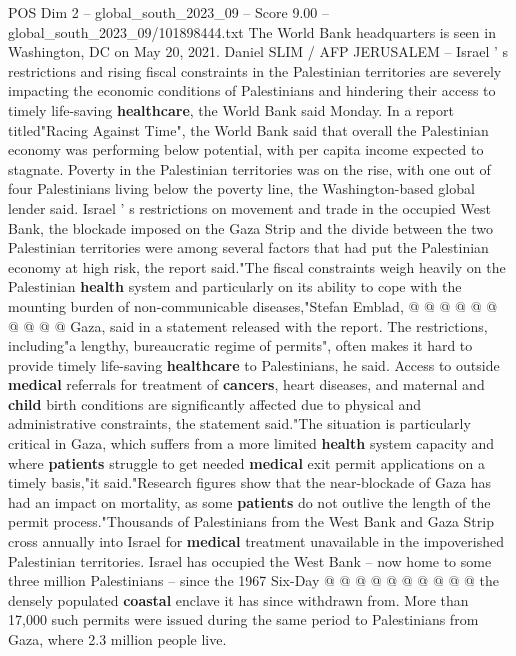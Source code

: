 \begin{textsample}{POS Dim 2 – global\_south\_2023\_09 – Score 9.00 – global\_south\_2023\_09/101898444.txt}  \label{ex:f2_pos_442}
The World Bank headquarters is seen in Washington, DC on May 20, 2021.
Daniel SLIM / AFP JERUSALEM -- Israel ' s restrictions and rising fiscal constraints in the Palestinian territories are severely impacting the economic conditions of Palestinians and hindering their access to timely life-saving \textbf{healthcare}, the World Bank said Monday.
In a report titled"Racing Against Time", the World Bank said that overall the Palestinian economy was performing below potential, with per capita income expected to stagnate.
Poverty in the Palestinian territories was on the rise, with one out of four Palestinians living below the poverty line, the Washington-based global lender said.
Israel ' s restrictions on movement and trade in the occupied West Bank, the blockade imposed on the Gaza Strip and the divide between the two Palestinian territories were among several factors that had put the Palestinian economy at high risk, the report said."The fiscal constraints weigh heavily on the Palestinian \textbf{health} system and particularly on its ability to cope with the mounting burden of non-communicable diseases,"Stefan Emblad, @ @ @ @ @ @ @ @ @ @ Gaza, said in a statement released with the report.
The restrictions, including"a lengthy, bureaucratic regime of permits", often makes it hard to provide timely life-saving \textbf{healthcare} to Palestinians, he said.
Access to outside \textbf{medical} referrals for treatment of \textbf{cancers}, heart diseases, and maternal and \textbf{child} birth conditions are significantly affected due to physical and administrative constraints, the statement said."The situation is particularly critical in Gaza, which suffers from a more limited \textbf{health} system capacity and where \textbf{patients} struggle to get needed \textbf{medical} exit permit applications on a timely basis,"it said."Research figures show that the near-blockade of Gaza has had an impact on mortality, as some \textbf{patients} do not outlive the length of the permit process."Thousands of Palestinians from the West Bank and Gaza Strip cross annually into Israel for \textbf{medical} treatment unavailable in the impoverished Palestinian territories.
Israel has occupied the West Bank -- now home to some three million Palestinians -- since the 1967 Six-Day @ @ @ @ @ @ @ @ @ @ the densely populated \textbf{coastal} enclave it has since withdrawn from.
More than 17,000 such permits were issued during the same period to Palestinians from Gaza, where 2.3 million people live.

\end{textsample}
